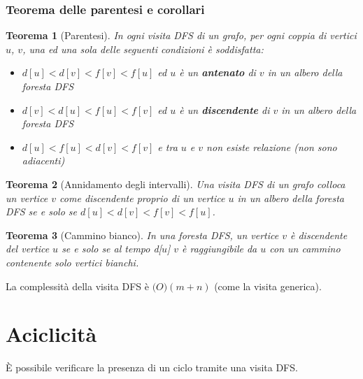 \documentclass[11pt]{article}
\newtheorem*{theorem}{Teorema}
\theoremstyle{proprietà}
\begin{document}
\subsubsection{Teorema delle parentesi e corollari}
\begin{theorem}[Parentesi]
    In ogni visita DFS di un grafo, per ogni coppia di vertici $u$, $v$, una ed una sola delle seguenti condizioni è soddisfatta: 
    \begin{itemize}
        \item $d[u]<d[v]<f[v]<f[u]$ ed $u$ è un \textbf{antenato} di $v$ in un albero della foresta DFS 
        \item $d[v]<d[u]<f[u]<f[v]$ ed $u$ è un \textbf{discendente} di $v$ in un albero della foresta DFS
        \item $d[u]<f[u]<d[v]<f[v]$ e tra $u$ e $v$ non esiste relazione (non sono adiacenti)
    \end{itemize}
\end{theorem}
\begin{theorem}[Annidamento degli intervalli]
    Una visita DFS di un grafo colloca un vertice $v$ come discendente proprio di un vertice $u$ in un albero della foresta 
    DFS se e solo se $d[u]<d[v]<f[v]<f[u]$.
\end{theorem}
\begin{theorem}[Cammino bianco]
    In una foresta DFS, un vertice $v$ è discendente del vertice $u$ se e solo se al tempo d[$u$] $v$ è raggiungibile da 
    $u$ con un cammino contenente solo vertici bianchi.
\end{theorem}
La complessità della visita DFS è $\mathcal(O)(m+n)$ (come la visita generica).
\section{Aciclicità}
È possibile verificare la presenza di un ciclo tramite una visita DFS.
\end{document}
